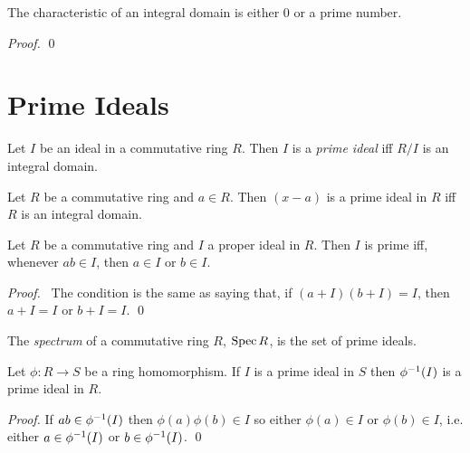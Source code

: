 \begin{prop}
The characteristic of an integral domain is either 0 or a prime number.
\end{prop}

\begin{proof}
\pf
{}
\qed
\end{proof}

\section{Prime Ideals}

\begin{df}
Let $I$ be an ideal in a commutative ring $R$. Then $I$ is a \emph{prime ideal} iff $R/I$ is an integral domain.
\end{df}

\begin{ex}
Let $R$ be a commutative ring and $a \in R$. Then $(x-a)$ is a prime ideal in $R$ iff $R$ is an integral domain.
\end{ex}

\begin{prop}
Let $R$ be a commutative ring and $I$ a proper ideal in $R$. Then $I$ is prime iff, whenever $ab \in I$, then $a \in I$ or $b \in I$.
\end{prop}

\begin{proof}
\pf\ The condition is the same as saying that, if $(a+I)(b+I) = I$, then $a+I = I$ or $b+I = I$. \qed
\end{proof}

\begin{df}[Spectrum]
The \emph{spectrum} of a commutative ring $R$, $\operatorname{Spec} R$, is the set of prime ideals.
\end{df}

\begin{prop}
Let $\phi : R \rightarrow S$ be a ring homomorphism. If $I$ is a prime ideal in $S$ then ${\phi}^{-1}(I)$ is a prime ideal in $R$.
\end{prop}

\begin{proof}
\pf
If $ab \in {\phi}^{-1}(I)$ then $\phi(a)\phi(b) \in I$ so either $\phi(a) \in I$ or $\phi(b) \in I$, i.e. either $a \in {\phi}^{-1}(I)$ or $b \in {\phi}^{-1}(I)$. \qed
\end{proof}

